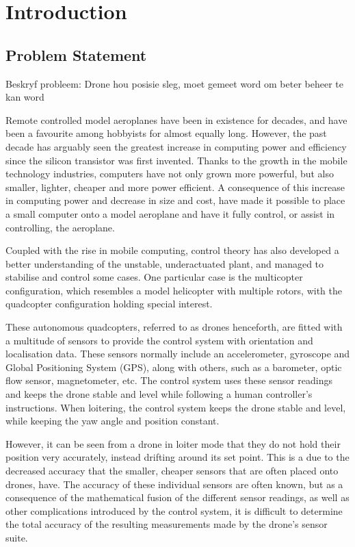 \chapter{Introduction}

\section{Problem Statement}

Beskryf probleem:
Drone hou posisie sleg, moet gemeet word om beter beheer te kan word

Remote controlled model aeroplanes have been in existence for decades, and have been a favourite among hobbyists for almost equally long. However, the past decade has arguably seen the greatest increase in computing power and efficiency since the silicon transistor was first invented. Thanks to the growth in the mobile technology industries, computers have not only grown more powerful, but also smaller, lighter, cheaper and more power efficient. A consequence of this increase in computing power and decrease in size and cost, have made it possible to place a small computer onto a model aeroplane and have it fully control, or assist in controlling, the aeroplane. 

Coupled with the rise in mobile computing, control theory has also developed a better understanding of the unstable, underactuated plant, and managed to stabilise and control some cases. One particular case is the multicopter configuration, which resembles a model helicopter with multiple rotors, with the quadcopter configuration holding special interest. 

These autonomous quadcopters, referred to as drones henceforth, are fitted with a multitude of sensors to provide the control system with orientation and localisation data. These sensors normally include an accelerometer, gyroscope and Global Positioning System (GPS), along with others, such as a barometer, optic flow sensor, magnetometer, etc. The control system uses these sensor readings and keeps the drone stable and level while following a human controller's instructions. When loitering, the control system keeps the drone stable and level, while keeping the yaw angle and position constant. 

However, it can be seen from a drone in loiter mode that they do not hold their position very accurately, instead drifting around its set point. This is a due to the decreased accuracy that the smaller, cheaper sensors that are often placed onto drones, have. The accuracy of these individual sensors are often known, but as a consequence of the mathematical fusion of the different sensor readings, as well as other complications introduced by the control system, it is difficult to determine the total accuracy of the resulting measurements made by the drone's sensor suite.

